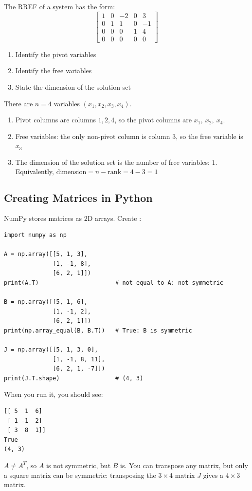 \begin{Exercise}[title=Free Variables,label=free1]
The RREF of a system has the form:
$$\begin{bmatrix}
1&0&-2&0&3\\
0&1&1&0&-1\\
0&0&0&1&4\\
0&0&0&0&0
\end{bmatrix}$$
\begin{enumerate}
       \item Identify the pivot variables
       \item Identify the free variables
       \item State the dimension of the solution set
\end{enumerate}
\end{Exercise}
\begin{Answer}[ref=free1]
There are $n=4$ variables $(x_1,x_2,x_3,x_4)$. 
\begin{enumerate}
       \item Pivot columns are columns $1,2,4$, so the pivot columns are $x_1,\ x_2,\ x_4$. 
       \item Free variables: the only non-pivot column is column $3$, so the free variable is $x_3$
       \item The dimension of the solution set is the number of free variables: $1$. Equivalently, $\text{dimension}=n-\text{rank}=4-3=1$
\end{enumerate}
\end{Answer}
\subsection{Creating Matrices in Python}
NumPy stores matrices as 2D arrays. Create :
\begin{verbatim}
import numpy as np

A = np.array([[5, 1, 3],
              [1, -1, 8],
              [6, 2, 1]])
print(A.T)                      # not equal to A: not symmetric

B = np.array([[5, 1, 6],
              [1, -1, 2],
              [6, 2, 1]])
print(np.array_equal(B, B.T))   # True: B is symmetric

J = np.array([[5, 1, 3, 0],
              [1, -1, 8, 11],
              [6, 2, 1, -7]])
print(J.T.shape)                # (4, 3)
\end{verbatim}
When you run it, you should see:
\begin{verbatim}
[[ 5  1  6]
 [ 1 -1  2]
 [ 3  8  1]]
True
(4, 3)
\end{verbatim}
$A \neq A^T$, so $A$ is not symmetric, but $B$ is. You can transpose any
matrix, but only a square matrix can be symmetric: transposing the $3
\times 4$ matrix $J$ gives a $4 \times 3$ matrix.

